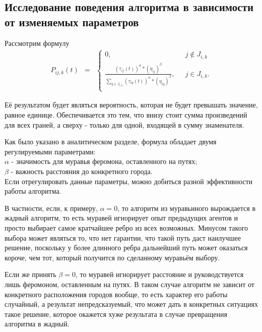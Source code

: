 \documentclass[../main.tex]{subfiles}
\begin{document}
	
\subsection{Исследование поведения алгоритма в зависимости от изменяемых параметров}
	
	Рассмотрим формулу
	\begin{equation*}
		\begin{matrix}
		P_{ij,k}(t) & = 
		& \left\{
			\begin{matrix}
			0, & \mbox{ } j \notin J_{i,k} \\
			\frac {(τ_{ij}(t))^\alpha * (η_{ij})^\beta} {\sum \limits_{q \in J_{i,k}} (τ_{iq}(t))^\alpha * (η_{iq})^\beta}, & \mbox{ } j \in J_{i,k}. \\
			\end{matrix} \right.
		\end{matrix}
	\end{equation*}
	
	Её результатом будет являться вероятность, которая не будет превышать значение, равное единице. 
	Обеспечивается это тем, что внизу стоит сумма произведений для всех граней, а сверху - только для одной, входящей в сумму знаменателя.
	
	Как было указано в аналитическом разделе, формула обладает двумя регулируемыми параметрами:\\
	$\alpha$ - значимость для муравья феромона, оставленного на путях; \\
	$\beta$ - важность расстояния до конкретного города.\\
	Если отрегулировать данные параметры, можно добиться разной эффективности работы алгоритма.
	
	В частности, если, к примеру, $\alpha = 0$, то алгоритм из муравьиного вырождается в жадный алгоритм, то есть муравей игнорирует опыт предыдущих агентов и просто выбирает самое кратчайшее ребро из всех возможных. 
	Минусом такого выбора может являться то, что нет гарантии, что такой путь даст наилучшее решение, поскольку у более длинного ребра дальнейший путь может оказаться короче, чем тот, который получится по сделанному муравьём выбору.
	
	Если же принять $\beta = 0$, то муравей игнорирует расстояние и руководствуется лишь феромоном, оставленным на путях. 
	В таком случае алгоритм не зависит от конкретного расположения городов вообще, то есть характер его работы случайный, а результат непредсказуемый, что может дать в конкретных ситуациях такое решение, которое окажется хуже результата в случае превращения алгоритма в жадный.
	
\end{document}
